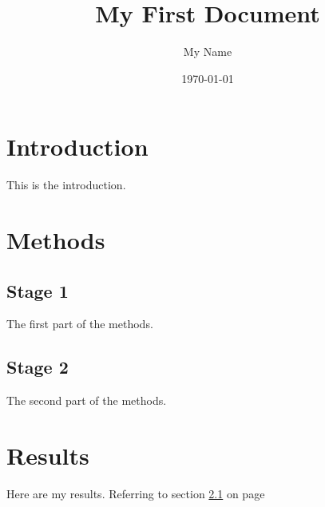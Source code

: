 \documentclass[a4paper, 12pt]{article}
\begin{document}
  \title{My First Document}
  \author{My Name}
  \date{\today}
  \maketitle
  \thispagestyle{empty}

  \tableofcontents
  \newpage

  \section{Introduction}
  This is the introduction.

  \section{Methods}

  \subsection{Stage 1}
  \label{sec1} The first part of the methods.

  \subsection{Stage 2}
  The second part of the methods.

  \section{Results}
  Here are my results. Referring to section \ref{sec1} on page \pageref{sec1}
\end{document}
